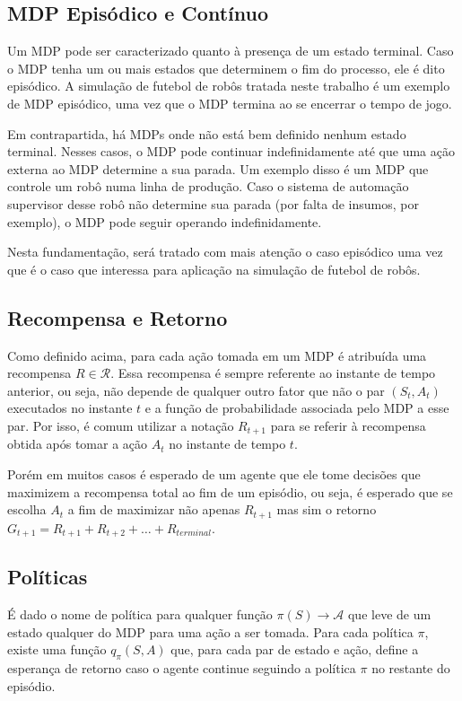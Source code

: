 \subsection{MDP Episódico e Contínuo}

Um MDP pode ser caracterizado quanto à presença de um estado terminal. Caso o MDP tenha um ou mais estados que determinem o fim do processo, ele é dito episódico. A simulação de futebol de robôs tratada neste trabalho é um exemplo de MDP episódico, uma vez que o MDP termina ao se encerrar o tempo de jogo.

Em contrapartida, há MDPs onde não está bem definido nenhum estado terminal. Nesses casos, o MDP pode continuar indefinidamente até que uma ação externa ao MDP determine a sua parada. Um exemplo disso é um MDP que controle um robô numa linha de produção. Caso o sistema de automação supervisor desse robô não determine sua parada (por falta de insumos, por exemplo), o MDP pode seguir operando indefinidamente.

Nesta fundamentação, será tratado com mais atenção o caso episódico uma vez que é o caso que interessa para aplicação na simulação de futebol de robôs.

\subsection{Recompensa e Retorno}

Como definido acima, para cada ação tomada em um MDP é atribuída uma recompensa $R \in \mathcal{R}$. Essa recompensa é sempre referente ao instante de tempo anterior, ou seja, não depende de qualquer outro fator que não o par $(S_t, A_t)$ executados no instante $t$ e a função de probabilidade associada pelo MDP a esse par. Por isso, é comum utilizar a notação $R_{t+1}$ para se referir à recompensa obtida após tomar a ação $A_t$ no instante de tempo $t$.

Porém em muitos casos é esperado de um agente que ele tome decisões que maximizem a recompensa total ao fim de um episódio, ou seja, é esperado que se escolha $A_t$ a fim de maximizar não apenas $R_{t+1}$ mas sim o retorno $G_{t+1} = R_{t+1} + R_{t+2} + \dotsc + R_{terminal}$.

\subsection{Políticas}

É dado o nome de política para qualquer função $\pi(S) \to \mathcal{A}$ que leve de um estado qualquer do MDP para uma ação a ser tomada. Para cada política $\pi$, existe uma função $q_\pi(S, A)$ que, para cada par de estado e ação, define a esperança de retorno caso o agente continue seguindo a política $\pi$ no restante do episódio.


